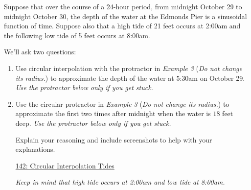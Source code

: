 \documentclass{ximera}
\begin{document}
\begin{example}  \label{E888b0bbdsdsf}
Suppose that over the course of a 24-hour period, from midnight October 29 to midnight October 30, the depth of the water at the Edmonds Pier is a sinusoidal function of time. Suppose also that a high tide of 21 feet occurs at 2:00am and the following low tide of 5 feet occurs at 8:00am. 

We'll ask two questions:

\begin{enumerate}
\item Use circular interpolation with the protractor in \emph{Example 3} (\emph{Do not change its radius.}) to approximate the depth of the water at 5:30am on October 29. \emph{Use the protractor below only if you get stuck.}

\item Use the circular protractor  in \emph{Example 3} (\emph{Do not change its radius.}) to approximate the first two times after midnight when the water is $18$ feet deep.  \emph{Use the protractor below only if you get stuck.}

Explain your reasoning and include screenshots to help with your explanations.
\begin{freeResponse}
\end{freeResponse}

\begin{onlineOnly}
    \begin{center}
\end{center}
\end{onlineOnly}

\href{https://www.desmos.com/calculator/0wxwmkzvky}{142: Circular Interpolation Tides}

\emph{Keep in mind that high tide occurs at 2:00am and low tide at 8:00am.}

\end{enumerate}
\end{example}
\end{document}
